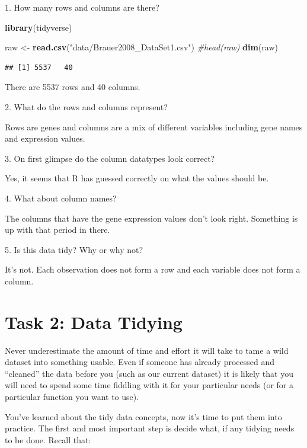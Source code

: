 \documentclass[]{book}
\newenvironment{Shaded}{\begin{snugshade}}{\end{snugshade}}
\newcommand{\CommentTok}[1]{\textcolor[rgb]{0.56,0.35,0.01}{\textit{#1}}}
\newcommand{\KeywordTok}[1]{\textcolor[rgb]{0.13,0.29,0.53}{\textbf{#1}}}
\newcommand{\NormalTok}[1]{#1}
\newcommand{\StringTok}[1]{\textcolor[rgb]{0.31,0.60,0.02}{#1}}
\begin{document}
1. How many rows and columns are there?

\begin{Shaded}
\begin{Highlighting}[]
\KeywordTok{library}\NormalTok{(tidyverse)}

\NormalTok{raw <-}\StringTok{ }\KeywordTok{read.csv}\NormalTok{(}\StringTok{"data/Brauer2008_DataSet1.csv"}\NormalTok{)}
\CommentTok{#head(raw)}
\KeywordTok{dim}\NormalTok{(raw)}
\end{Highlighting}
\end{Shaded}

\begin{verbatim}
## [1] 5537   40
\end{verbatim}

There are 5537 rows and 40 columns.

2. What do the rows and columns represent?

Rows are genes and columns are a mix of different variables including gene names and expression values.

3. On first glimpse do the column datatypes look correct?

Yes, it seems that R has guessed correctly on what the values should be.

4. What about column names?

The columns that have the gene expression values don't look right. Something is up with that period in there.

5. Is this data tidy? Why or why not?

It's not. Each observation does not form a row and each variable does not form a column.

\hypertarget{task-2-data-tidying}{%
\section*{Task 2: Data Tidying}\label{task-2-data-tidying}}

Never underestimate the amount of time and effort it will take to tame a wild dataset into something usable. Even if someone has already processed and ``cleaned'' the data before you (such as our current dataset) it is likely that you will need to spend some time fiddling with it for your particular needs (or for a particular function you want to use).

You've learned about the tidy data concepts, now it's time to put them into practice. The first and most important step is decide what, if any tidying needs to be done. Recall that:
\end{document}
